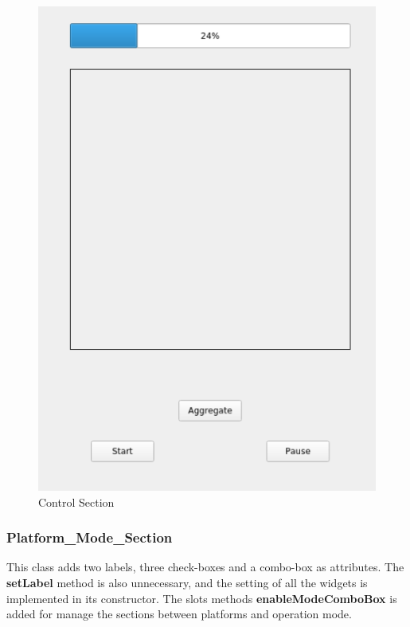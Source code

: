 \documentclass[parskip=full]{scrartcl}
\newcommand\tab[1][1cm]{\hspace*{#1}}
\begin{document}
         \begin{figure}[H]
	        \centering
	        \includegraphics[scale=0.7]{images/control_section2.PNG}
	        \caption{Control Section}
	        \label{fig:my_label}
	    \end{figure}       
        
        \subsubsection{Platform\_Mode\_Section}
        \tab This class adds two labels, three check-boxes and a combo-box as attributes. The \textbf{setLabel} method is also unnecessary, and the setting of all the widgets is implemented in its constructor. The slots methods \textbf{enableModeComboBox} is added for manage the sections between platforms and operation mode.
        
\end{document}
